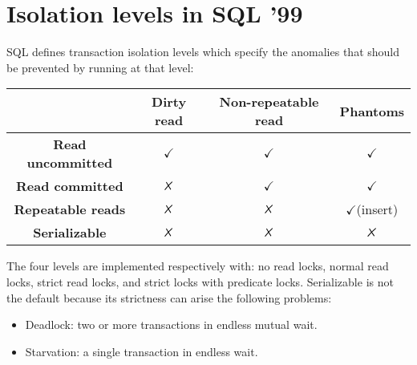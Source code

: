 \section{Isolation levels in SQL '99}

SQL defines transaction isolation levels which specify the anomalies that should be prevented by running at that level:

\begin{table}[H]
    \centering      
    \begin{tabular}{c|ccc|}
    \cline{2-4}
                                                    & \textbf{Dirty read} & \textbf{Non-repeatable read} & \textbf{Phantoms}    \\ \hline
    \multicolumn{1}{|c|}{\textbf{Read uncommitted}} & $\checkmark$        & $\checkmark$                 & $\checkmark$         \\
    \multicolumn{1}{|c|}{\textbf{Read committed}}   & $\tikzxmark$        & $\checkmark$                 & $\checkmark$         \\
    \multicolumn{1}{|c|}{\textbf{Repeatable reads}}  & $\tikzxmark$        & $\tikzxmark$                 & $\checkmark$(insert) \\
    \multicolumn{1}{|c|}{\textbf{Serializable}}     & $\tikzxmark$        & $\tikzxmark$                 & $\tikzxmark$         \\ \hline
    \end{tabular}
\end{table}
The four levels are implemented respectively with: no read locks, normal read locks, strict read locks, and strict locks with predicate locks. Serializable is not the default 
because its strictness can arise the following problems: 
\begin{itemize}
    \item Deadlock: two or more transactions in endless mutual wait. 
    \item Starvation: a single transaction in endless wait. 
\end{itemize}